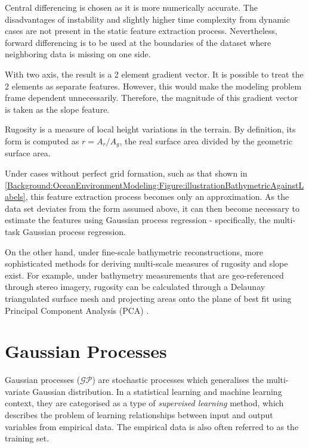			Central differencing is chosen as it is more numerically accurate. The disadvantages of instability and slightly higher time complexity from dynamic cases are not present in the static feature extraction process. Nevertheless, forward differencing is to be used at the boundaries of the dataset where neighboring data is missing on one side.
						
			With two axis, the result is a 2 element gradient vector. It is possible to treat the 2 elements as separate features. However, this would make the modeling problem frame dependent unnecessarily. Therefore, the magnitude of this gradient vector is taken as the slope feature. 
			
			Rugosity is a measure of local height variations in the terrain. By definition, its form is computed as $r = A_{r}/A_{g}$, the real surface area divided by the geometric surface area.
			
			Under cases without perfect grid formation, such as that shown in \cref{Background:OceanEnvironmentModeling:Figure:illustrationBathymetricAgainstLabels}, this feature extraction process becomes only an approximation. As the data set deviates from the form assumed above, it can then become necessary to estimate the features using Gaussian process regression - specifically, the multi-task Gaussian process regression. 
			
		 	On the other hand, under fine-scale bathymetric reconstructions, more sophisticated methods for deriving multi-scale measures of rugosity and slope exist. For example, under bathymetry measurements that are geo-referenced through stereo imagery, rugosity can be calculated through a Delaunay triangulated surface mesh and projecting areas onto the plane of best fit using Principal Component Analysis (PCA) \cite{StefanWilliams:Rugosity}.
							
			\FloatBarrier
			
	\section{Gaussian Processes}
	\label{Background:GaussianProcesses}
	
		Gaussian processes ($\mathcal{GP}$) are stochastic processes which generalises the multi-variate Gaussian distribution. In a statistical learning and machine learning context, they are categorised as a type of \textit{supervised learning} method, which describes the problem of learning relationships between input and output variables from empirical data. The empirical data is also often referred to as the training set.
		
